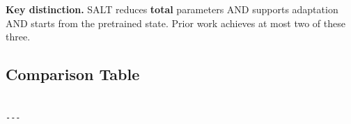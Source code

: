 \textbf{Key distinction.} SALT reduces \textbf{total} parameters AND supports 
adaptation AND starts from the pretrained state. Prior work achieves at most 
two of these three.



\subsection{Comparison Table}

\begin{lstlisting}

---
\end{lstlisting}